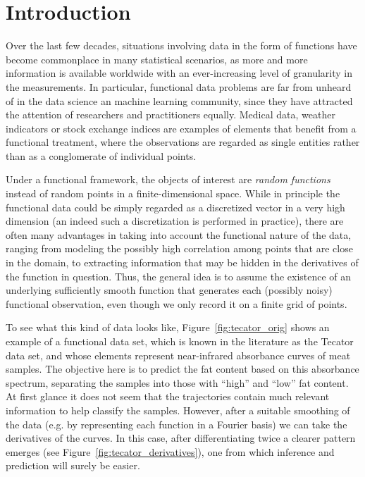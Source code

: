 %
%

\chapter{Introduction}\label{ch:introduction}

Over the last few decades, situations involving data in the form of functions have become commonplace in many statistical scenarios, as more and more information is available worldwide with an ever-increasing level of granularity in the measurements. In particular, functional data problems are far from unheard of in the data science an machine learning community, since they have attracted the attention of researchers and practitioners equally. Medical data, weather indicators or stock exchange indices are examples of elements that benefit from a functional treatment, where the observations are regarded as single entities rather than as a conglomerate of individual points.

Under a functional framework, the objects of interest are \textit{random functions} instead of random points in a finite-dimensional space. While in principle the functional data could be simply regarded as a discretized vector in a very high dimension (an indeed such a discretization is performed in practice), there are often many advantages in taking into account the functional nature of the data, ranging from modeling the possibly high correlation among points that are close in the domain, to extracting information that may be hidden in the derivatives of the function in question. Thus, the general idea is to assume the existence of an underlying sufficiently smooth function that generates each (possibly noisy) functional observation, even though we only record it on a finite grid of points.

To see what this kind of data looks like, Figure~\ref{fig:tecator_orig} shows an example of a functional data set, which is known in the literature as the Tecator data set, and whose elements represent near-infrared absorbance curves of meat samples. The objective here is to predict the fat content based on this absorbance spectrum, separating the samples into those with ``high'' and ``low'' fat content. At first glance it does not seem that the trajectories contain much relevant information to help classify the samples. However, after a suitable smoothing of the data (e.g. by representing each function in a Fourier basis) we can take the derivatives of the curves. In this case, after differentiating twice a clearer pattern emerges (see Figure~\ref{fig:tecator_derivatives}), one from which inference and prediction will surely be easier.

